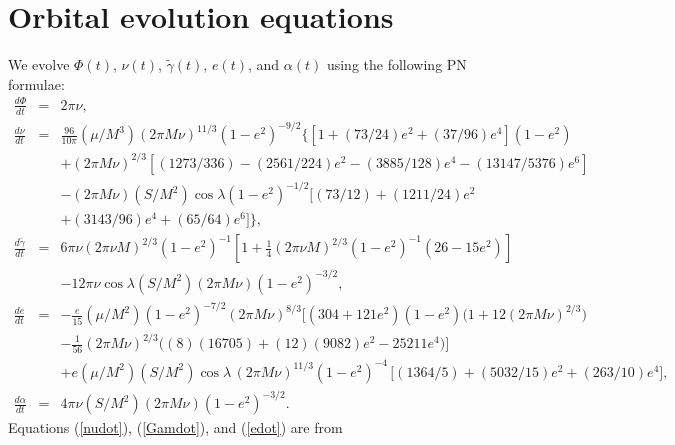 \documentclass[11pt]{report}
\begin{document}
\section{Orbital evolution equations}
\label{EvEq}

We evolve $\Phi(t)$, $\nu(t)$, $\tilde\gamma(t)$, $e(t)$,
and $\alpha(t)$ using the following PN formulae:
\begin{eqnarray}
\frac{d\Phi}{dt} &=& 2\pi\nu, \label{Phidot} \\
%
\frac{d\nu}{dt} &=&
\frac{96}{10\pi}(\mu/M^3)(2\pi M\nu)^{11/3}(1-e^2)^{-9/2}
\bigl\{
\left[1+(73/24)e^2+(37/96)e^4\right](1-e^2) \nonumber \\
&&+ (2\pi M\nu)^{2/3}\left[(1273/336)-(2561/224)e^2-(3885/128)e^4
-(13147/5376)e^6 \right] \nonumber \\
&&- (2\pi M\nu)(S/M^2)\cos\lambda (1-e^2)^{-1/2}\bigl[(73/12)
+ (1211/24)e^2 \nonumber \\
&&+(3143/96)e^4 +(65/64)e^6 \bigr]
\bigr\}, \label{nudot} \\
%
\frac{d\tilde\gamma}{dt} &=& 6\pi\nu(2\pi\nu M)^{2/3} (1-e^2)^{-1}
\left[1+\frac{1}{4}(2\pi\nu M)^{2/3} (1-e^2)^{-1}(26-15e^2)\right] \nonumber \\
&&-12\pi\nu\cos\lambda (S/M^2) (2\pi M\nu)(1-e^2)^{-3/2},
\label{Gamdot} \\
%
\frac{de}{dt}  &=& -\frac{e}{15}(\mu/M^2) (1-e^2)^{-7/2} (2\pi M\nu)^{8/3}
\bigl[(304+121e^2)(1-e^2)\bigl(1 + 12 (2\pi M\nu)^{2/3}\bigr) \, \nonumber \\
&&- \frac{1}{56}(2\pi M\nu)^{2/3}\bigl( (8)(16705) + (12)(9082)e^2 - 25211e^4 \bigr)\bigr]\,
\nonumber \\
&&+ e (\mu/M^2)(S/M^2)\cos\lambda\,(2\pi M\nu)^{11/3}(1-e^2)^{-4}
\, \bigl[(1364/5) + (5032/15)e^2 + (263/10)e^4\bigr] ,
\label{edot} \\
%
\frac{d\alpha}{dt} &=& 4\pi\nu (S/M^2) (2\pi M\nu)(1-e^2)^{-3/2}.
\label{alphadot}
\end{eqnarray}
Equations (\ref{nudot}), (\ref{Gamdot}), and (\ref{edot}) are from
\end{document}
